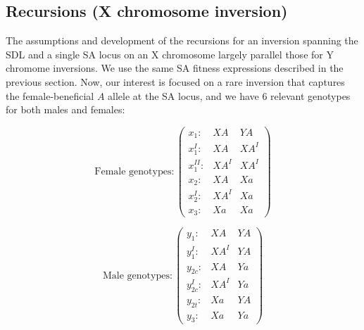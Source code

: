 \documentclass{article}
\begin{document}
\subsection{Recursions (X chromosome inversion)}

The assumptions and development of the recursions for an inversion spanning the SDL and a single SA locus on an X chromosome largely parallel those for Y chromome inversions. We use the same SA fitness expressions described in the previous section. Now, our interest is focused on a rare inversion that captures the female-beneficial $A$ allele at the SA locus, and we have $6$ relevant genotypes for both males and females:

\begin{equation*}
	\text{Female genotypes}:\left( \begin{array}{cc|c}
		x_1:        & XA   & YA \\
		x^I_{1}:    & XA   & XA^I \\
		x^{II}_{1}: & XA^I & XA^I \\
		x_{2}:      & XA   & Xa \\
		x^I_{2}:    & XA^I & Xa \\
		x_{3}:      & Xa   & Xa 
	\end{array} \right)
\end{equation*}

\begin{equation*}
	\text{Male genotypes}:\left( \begin{array}{cc|c}
		y_1:      & XA   & YA \\
		y^I_{1}:  & XA^I & YA \\
		y_{2c}:   & XA   & Ya \\
		y^I_{2c}: & XA^I & Ya \\
		y_{2t}:   & Xa & YA \\
		y_{3}:    & Xa & Ya 
	\end{array} \right)
\end{equation*}
\end{document}
